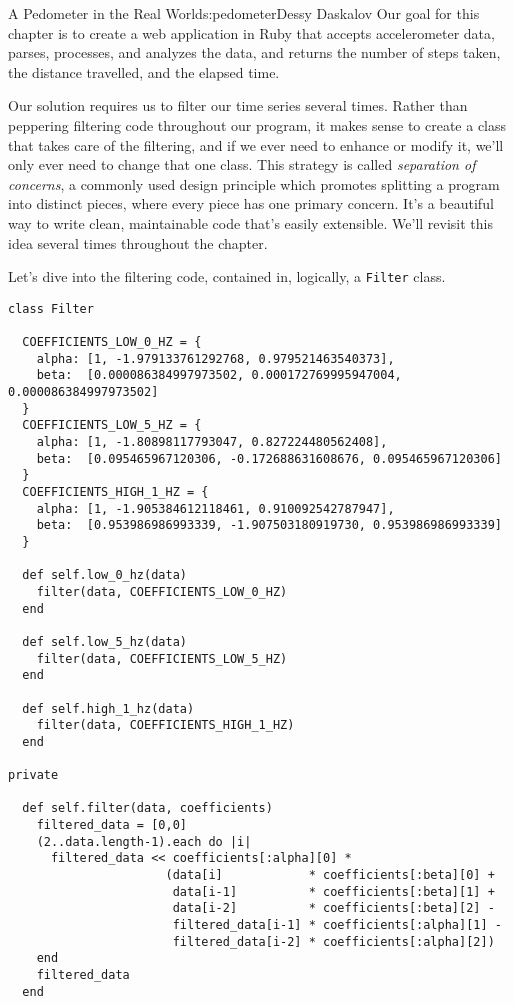 \begin{aosachapter}{A Pedometer in the Real World}{s:pedometer}{Dessy Daskalov}
Our goal for this chapter is to create a web application in Ruby that
accepts accelerometer data, parses, processes, and analyzes the data,
and returns the number of steps taken, the distance travelled, and the
elapsed time.

\label{preliminary-work}

Our solution requires us to filter our time series several times. Rather
than peppering filtering code throughout our program, it makes sense to
create a class that takes care of the filtering, and if we ever need to
enhance or modify it, we'll only ever need to change that one class.
This strategy is called \emph{separation of concerns}, a commonly used
design principle which promotes splitting a program into distinct
pieces, where every piece has one primary concern. It's a beautiful way
to write clean, maintainable code that's easily extensible. We'll
revisit this idea several times throughout the chapter.

Let's dive into the filtering code, contained in, logically, a
\texttt{Filter} class.

\begin{verbatim}
class Filter

  COEFFICIENTS_LOW_0_HZ = {
    alpha: [1, -1.979133761292768, 0.979521463540373],
    beta:  [0.000086384997973502, 0.000172769995947004, 0.000086384997973502]
  }
  COEFFICIENTS_LOW_5_HZ = {
    alpha: [1, -1.80898117793047, 0.827224480562408],
    beta:  [0.095465967120306, -0.172688631608676, 0.095465967120306]
  }
  COEFFICIENTS_HIGH_1_HZ = {
    alpha: [1, -1.905384612118461, 0.910092542787947],
    beta:  [0.953986986993339, -1.907503180919730, 0.953986986993339]
  }

  def self.low_0_hz(data)
    filter(data, COEFFICIENTS_LOW_0_HZ)
  end

  def self.low_5_hz(data)
    filter(data, COEFFICIENTS_LOW_5_HZ)
  end

  def self.high_1_hz(data)
    filter(data, COEFFICIENTS_HIGH_1_HZ)
  end

private

  def self.filter(data, coefficients)
    filtered_data = [0,0]
    (2..data.length-1).each do |i|
      filtered_data << coefficients[:alpha][0] *
                      (data[i]            * coefficients[:beta][0] +
                       data[i-1]          * coefficients[:beta][1] +
                       data[i-2]          * coefficients[:beta][2] -
                       filtered_data[i-1] * coefficients[:alpha][1] -
                       filtered_data[i-2] * coefficients[:alpha][2])
    end
    filtered_data
  end


\end{verbatim}
\end{aosachapter}
